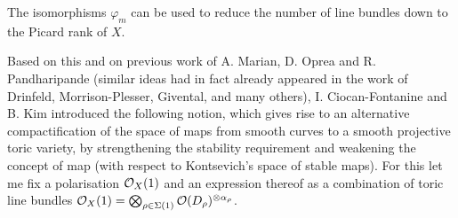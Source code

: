 \begin{rmk}
 The isomorphisms $\varphi_m$ can be used to reduce the number of line bundles down to the Picard rank of $X$.
\end{rmk}

Based on this and on previous work of A. Marian, D. Oprea and R. Pandharipande \cite{MOP} (similar ideas had in fact already appeared in the work of Drinfeld, Morrison-Plesser, Givental, and many others), I. Ciocan-Fontanine and B. Kim introduced the following notion, which gives rise to an alternative compactification of the space of maps from smooth curves to a smooth projective toric variety, by strengthening the stability requirement and weakening the concept of map (with respect to Kontsevich's space of stable maps). For this let me fix a polarisation $\mathcal{O}_X(1)$ and an expression thereof as a combination of toric line bundles $\mathcal{O}_X(1)=\bigotimes_{\rho\in\Sigma(1)}\mathcal{O}(D_\rho)^{\otimes \alpha_\rho}$.

